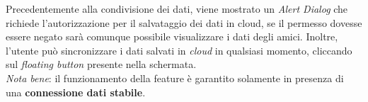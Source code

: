 \documentclass{article}
\begin{document}
    Precedentemente alla condivisione dei dati, viene mostrato un \textit{Alert Dialog} che richiede l'autorizzazione per il salvataggio dei dati in cloud, se il permesso dovesse essere negato sarà comunque possibile visualizzare i dati degli amici.
    Inoltre, l'utente può sincronizzare i dati salvati in \textit{cloud} in qualsiasi momento, cliccando sul \textit{floating button} presente nella schermata. \vspace*{7pt}\\
    \textit{Nota bene}: il funzionamento della feature è garantito solamente in presenza di una \textbf{connessione dati stabile}.
    \begin{figure}[H]
        \centering
    \end{figure}
\end{document}
